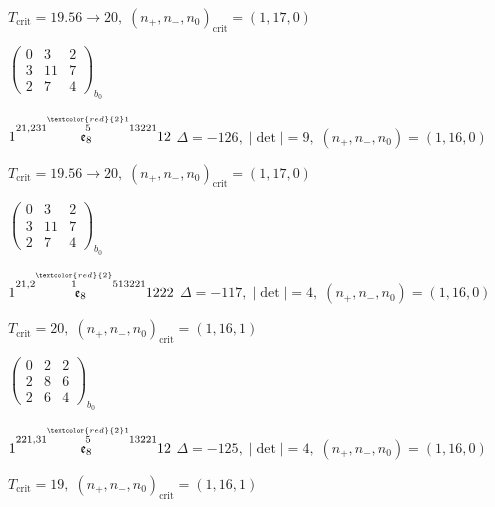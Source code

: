 \documentclass[10pt]{article}
\begin{document}
\hspace{1em}$T_{\text{crit}}=19.56 \to 20,\; (n_+,n_-,n_0)_{\text{crit}}=(1,17,0)$

\hspace{2em}$\left(\begin{smallmatrix}0 & 3 & 2 \\ 3 & 11 & 7 \\ 2 & 7 & 4\end{smallmatrix}\right)_{\!b_0}$

\smallskip

$1\overset{21,231\overset{\textcolor{red}{2}1}{5}13221}{\mathfrak{e}_8}12$ \quad $\Delta=-126,\; |\det|=9,\; (n_+,n_-,n_0)=(1,16,0)$

\hspace{1em}$T_{\text{crit}}=19.56 \to 20,\; (n_+,n_-,n_0)_{\text{crit}}=(1,17,0)$

\hspace{2em}$\left(\begin{smallmatrix}0 & 3 & 2 \\ 3 & 11 & 7 \\ 2 & 7 & 4\end{smallmatrix}\right)_{\!b_0}$

\smallskip

$1\overset{21,2\overset{\textcolor{red}{2}}{1}513221}{\mathfrak{e}_8}1222$ \quad $\Delta=-117,\; |\det|=4,\; (n_+,n_-,n_0)=(1,16,0)$

\hspace{1em}$T_{\text{crit}}=20,\; (n_+,n_-,n_0)_{\text{crit}}=(1,16,1)$

\hspace{2em}$\left(\begin{smallmatrix}0 & 2 & 2 \\ 2 & 8 & 6 \\ 2 & 6 & 4\end{smallmatrix}\right)_{\!b_0}$

\smallskip

$1\overset{221,31\overset{\textcolor{red}{2}1}{5}13221}{\mathfrak{e}_8}12$ \quad $\Delta=-125,\; |\det|=4,\; (n_+,n_-,n_0)=(1,16,0)$

\hspace{1em}$T_{\text{crit}}=19,\; (n_+,n_-,n_0)_{\text{crit}}=(1,16,1)$
\end{document}
